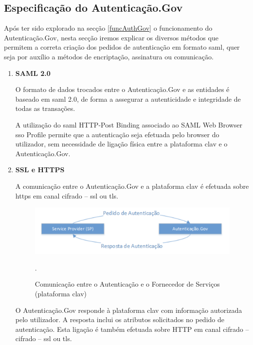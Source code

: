 \subsection{Especificação do Autenticação.Gov} \label{especificacaoAuthGov}

Após ter sido explorado na secção \ref{funcAuthGov} o funcionamento do Autenticação.Gov, nesta secção iremos explicar os diversos métodos que permitem a correta criação dos pedidos de autenticação em formato \gls{saml}, quer seja por auxílio a métodos de encriptação, assinatura ou comunicação.

\begin{enumerate}
    \item \textbf{SAML 2.0}
    
    O formato de dados trocados entre o Autenticação.Gov e as entidades é baseado em \gls{saml} 2.0, de forma a assegurar a autenticidade e integridade de todas as transações.
    
    A utilização do \gls{saml} HTTP-Post Binding associado ao SAML Web Browser \gls{sso} Profile permite que a autenticação seja efetuada pelo browser do utilizador, sem necessidade de ligação física entre a plataforma \gls{clav} e o Autenticação.Gov.
    
    \item \textbf{SSL e HTTPS}
    
    A comunicação entre o Autenticação.Gov e a plataforma \gls{clav} é efetuada sobre \gls{https} em canal cifrado – \gls{ssl} ou \gls{tls}.
    
    \begin{figure}[h]
        \centering
        \includegraphics[width=\textwidth]{img/saml/pedido.png}
        \caption{Comunicação entre o Autenticação e o Fornecedor de Serviços (plataforma \gls{clav})}.
    \end{figure}
  
    O Autenticação.Gov responde à plataforma \gls{clav} com informação autorizada pelo utilizador. A resposta inclui os atributos solicitados no pedido de autenticação. Esta ligação é também efetuada sobre HTTP em canal cifrado – cifrado – \gls{ssl} ou \gls{tls}.
    

\end{enumerate}
